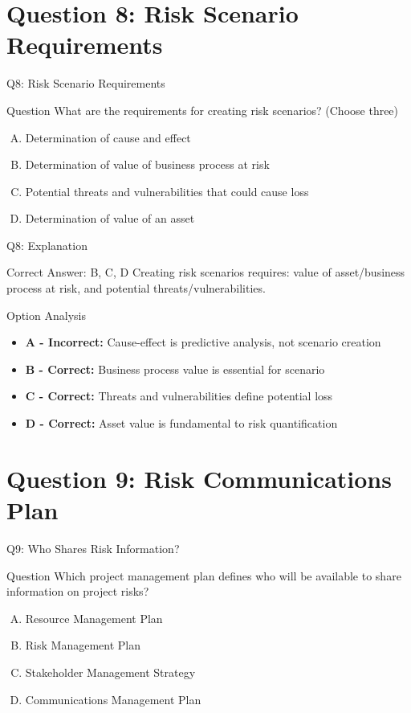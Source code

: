 \documentclass{beamer}
\begin{document}
	\section{Question 8: Risk Scenario Requirements}
	
	\begin{frame}{Q8: Risk Scenario Requirements}
		\begin{block}{Question}
			What are the requirements for creating risk scenarios? (Choose three)
		\end{block}
		\begin{enumerate}[(A)]
			\item Determination of cause and effect
			\item Determination of value of business process at risk
			\item Potential threats and vulnerabilities that could cause loss
			\item Determination of value of an asset
		\end{enumerate}
	\end{frame}
	
	\begin{frame}{Q8: Explanation}
		\begin{block}{Correct Answer: B, C, D}
			Creating risk scenarios requires: value of asset/business process at risk, and potential threats/vulnerabilities.
		\end{block}
		\begin{block}{Option Analysis}
			\begin{itemize}
				\item \textbf{A - Incorrect:} Cause-effect is predictive analysis, not scenario creation
				\item \textbf{B - Correct:} Business process value is essential for scenario
				\item \textbf{C - Correct:} Threats and vulnerabilities define potential loss
				\item \textbf{D - Correct:} Asset value is fundamental to risk quantification
			\end{itemize}
		\end{block}
	\end{frame}
	
	\section{Question 9: Risk Communications Plan}
	
	\begin{frame}{Q9: Who Shares Risk Information?}
		\begin{block}{Question}
			Which project management plan defines who will be available to share information on project risks?
		\end{block}
		\begin{enumerate}[(A)]
			\item Resource Management Plan
			\item Risk Management Plan
			\item Stakeholder Management Strategy
			\item Communications Management Plan
		\end{enumerate}
	\end{frame}
	
\end{document}

